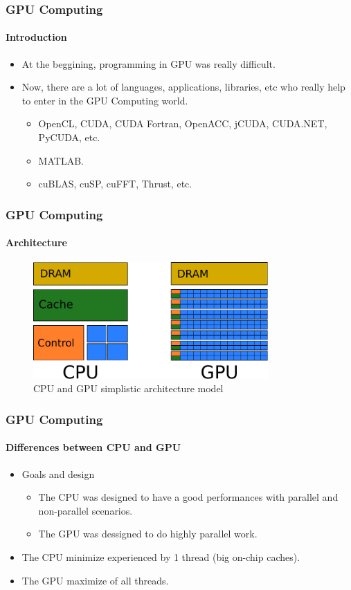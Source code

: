 \begin{frame}
    \frametitle{GPU Computing}
    \framesubtitle{Introduction}
    \begin{itemize}
        \item At the beggining, programming in GPU was really difficult.
        \item Now, there are a lot of languages, applications, libraries, etc
            who really help to enter in the GPU Computing world.
        \begin{itemize}
            \item OpenCL, CUDA, CUDA Fortran, OpenACC, jCUDA, CUDA.NET, PyCUDA, etc.
            \item MATLAB.
            \item cuBLAS, cuSP, cuFFT, Thrust, etc.
        \end{itemize}
    \end{itemize}
\end{frame}

\begin{frame}
    \frametitle{GPU Computing}
    \framesubtitle{Architecture}
    \begin{figure}
        \centering
        \label{fig:architecture}
        \includegraphics[width=0.8\textwidth]{img/architecture.pdf}
        \caption{CPU and GPU simplistic architecture model}
    \end{figure}
\end{frame}

\begin{frame}
    \frametitle{GPU Computing}
    \framesubtitle{Differences between CPU and GPU}
    \begin{itemize}
        \item Goals and design
        \begin{itemize}
            \item The CPU was designed to have a good performances with parallel and non-parallel
                  scenarios.
            \item The GPU was dessigned to do highly parallel work.
        \end{itemize}
        \item The CPU minimize  experienced by 1 thread (big on-chip caches).
        \item The GPU maximize  of all threads.
    \end{itemize}
\end{frame}

